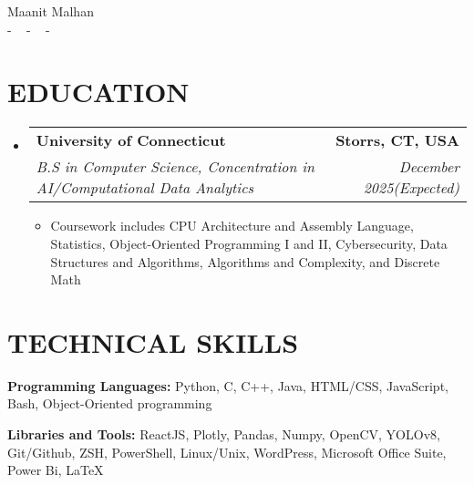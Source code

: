 \documentclass[letterpaper,11pt]{article}
\makeatletter
\newcommand{\resumeItem}[1]{
  \item\small{
    {#1 \vspace{-1pt}}
  }
}
\newcommand{\resumeSubheading}[4]{
  \vspace{-2pt}\item
    \begin{tabular*}{1.0\textwidth}[t]{l@{\extracolsep{\fill}}r}
      \textbf{\large#1} & \textbf{\small #2} \\
      \textit{\large#3} & \textit{\small #4} \\
      
    \end{tabular*}\vspace{-7pt}
}
\newcommand{\resumeSubHeadingListStart}{\begin{itemize}[leftmargin=0.0in, label={}]}
\newcommand{\resumeSubHeadingListEnd}{\end{itemize}}
\newcommand{\resumeItemListStart}{\begin{itemize}[leftmargin=0.1in]}
\newcommand{\resumeItemListEnd}{\end{itemize}\vspace{-5pt}}
\makeatother
\begin{document}


\begin{center}
    {\huge Maanit Malhan} \\ \vspace{2pt} 
    \small{-}
    \href{mailto:[maanitmalhan@gmail.com]}{\color{blue}{maanitmalhan@gmail.com}} ~ 
    \small{-}
    \href{[https://www.linkedin.com/in/maanit-malhan/]}{ \color{blue}{https://www.linkedin.com/in/maanit-malhan}}  ~
    \small{-}
    \href{[Maanit Malhan]}{ \color{blue}{https://github.com/maanitmalhan}} ~
    \vspace{-7pt}
\end{center}

\section{\color{airforceblue}EDUCATION}
  \resumeSubHeadingListStart
    \resumeSubheading
      {University of Connecticut}{Storrs, CT, USA}
      {B.S in Computer Science, Concentration in AI/Computational Data Analytics}{December 2025(Expected)}
       \resumeItemListStart
            \resumeItem{\normalsize{Coursework includes CPU Architecture and Assembly Language, Statistics, Object-Oriented Programming I and II, Cybersecurity, Data Structures and Algorithms, Algorithms and Complexity, and Discrete Math}}
            
      \resumeItemListEnd  
    \vspace{-4pt}
     
  \resumeSubHeadingListEnd
  \vspace{-10pt}

\section{\color{airforceblue}TECHNICAL SKILLS}
 \begin{itemize}[leftmargin=0in, label={}]
    \small{\item{
     \textbf{\normalsize{Programming Languages:}}{ \normalsize{Python, C, C++, Java, HTML/CSS, JavaScript, Bash, Object-Oriented programming}} \\
      \vspace{1.2pt}
      
     \textbf{\normalsize{Libraries and Tools:}}{ \normalsize{ReactJS, Plotly, Pandas, Numpy, OpenCV, YOLOv8, Git/Github, ZSH, PowerShell, Linux/Unix, WordPress, Microsoft Office Suite, Power Bi, LaTeX}} \\
      \vspace{1.2pt}
      
     
     }}
 \end{itemize}
 \vspace{-16pt}
 
\end{document}
